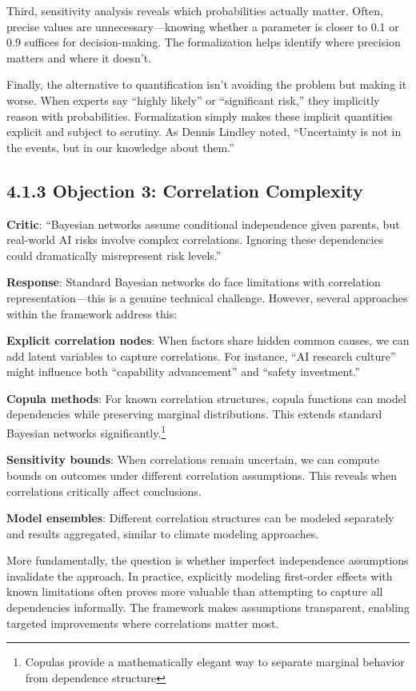 \documentclass[
  11pt,
  letterpaper,
  openany]{book}
\begin{document}
Third, sensitivity analysis reveals which probabilities actually matter.
Often, precise values are unnecessary---knowing whether a parameter is
closer to 0.1 or 0.9 suffices for decision-making. The formalization
helps identify where precision matters and where it doesn't.

Finally, the alternative to quantification isn't avoiding the problem
but making it worse. When experts say ``highly likely'' or ``significant
risk,'' they implicitly reason with probabilities. Formalization simply
makes these implicit quantities explicit and subject to scrutiny. As
Dennis Lindley noted, ``Uncertainty is not in the events, but in our
knowledge about them.''

\subsection{4.1.3 Objection 3: Correlation
Complexity}\label{sec-correlation-complexity}

\textbf{Critic}: ``Bayesian networks assume conditional independence
given parents, but real-world AI risks involve complex correlations.
Ignoring these dependencies could dramatically misrepresent risk
levels.''

\textbf{Response}: Standard Bayesian networks do face limitations with
correlation representation---this is a genuine technical challenge.
However, several approaches within the framework address this:

\textbf{Explicit correlation nodes}: When factors share hidden common
causes, we can add latent variables to capture correlations. For
instance, ``AI research culture'' might influence both ``capability
advancement'' and ``safety investment.''

\textbf{Copula methods}: For known correlation structures, copula
functions can model dependencies while preserving marginal
distributions. This extends standard Bayesian networks
significantly.\footnote{Copulas provide a mathematically elegant way to
  separate marginal behavior from dependence structure}

\textbf{Sensitivity bounds}: When correlations remain uncertain, we can
compute bounds on outcomes under different correlation assumptions. This
reveals when correlations critically affect conclusions.

\textbf{Model ensembles}: Different correlation structures can be
modeled separately and results aggregated, similar to climate modeling
approaches.

More fundamentally, the question is whether imperfect independence
assumptions invalidate the approach. In practice, explicitly modeling
first-order effects with known limitations often proves more valuable
than attempting to capture all dependencies informally. The framework
makes assumptions transparent, enabling targeted improvements where
correlations matter most.
\end{document}
